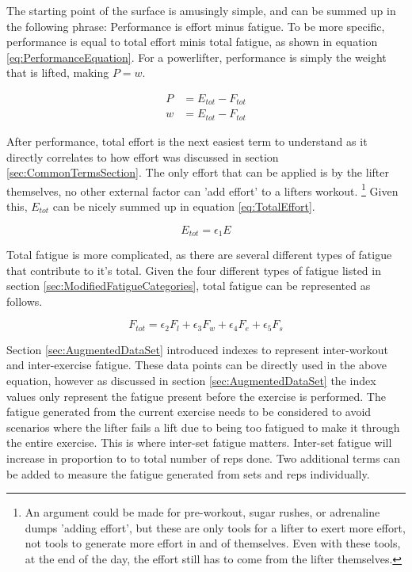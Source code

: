 The starting point of the surface is amusingly simple, and can be summed up in the following phrase: Performance is effort minus fatigue. To be more specific, performance is equal to total effort minis total fatigue, as shown in equation \ref{eq:PerformanceEquation}. For a powerlifter, performance is simply the weight that is lifted, making $P=w$.

\begin{equation}
	\label{eq:PerformanceEquation}
	\begin{split}
			P &= E_{tot}-F_{tot} \\
			w &= E_{tot}-F_{tot}
	\end{split}
\end{equation}

After performance, total effort is the next easiest term to understand as it directly correlates to how effort was discussed in section \ref{sec:CommonTermsSection}. The only effort that can be applied is by the lifter themselves, no other external factor can 'add effort' to a lifters workout. \footnote{An argument could be made for pre-workout, sugar rushes, or adrenaline dumps 'adding effort', but these are only tools for a lifter to exert more effort, not tools to generate more effort in and of themselves. Even with these tools, at the end of the day, the effort still has to come from the lifter themselves.} Given this, $E_{tot}$ can be nicely summed up in equation \ref{eq:TotalEffort}.

\begin{equation}
	\label{eq:TotalEffort}
	E_{tot}=\epsilon_1 E
\end{equation}

Total fatigue is more complicated, as there are several different types of fatigue that contribute to it's total. Given the four different types of fatigue listed in section \ref{sec:ModifiedFatigueCategories}, total fatigue can be represented as follows.

\begin{equation*}
	F_{tot}=\epsilon_2 F_l+\epsilon_3 F_w+\epsilon_4 F_e+\epsilon_5 F_s
\end{equation*}

Section \ref{sec:AugmentedDataSet} introduced indexes to represent inter-workout and inter-exercise fatigue. These data points can be directly used in the above equation, however as discussed in section \ref{sec:AugmentedDataSet} the index values only represent the fatigue present before the exercise is performed. The fatigue generated from the current exercise needs to be considered to avoid scenarios where the lifter fails a lift due to being too fatigued to make it through the entire exercise. This is where inter-set fatigue matters. Inter-set fatigue will increase in proportion to to total number of reps done. Two additional terms can be added to measure the fatigue generated from sets and reps individually.

